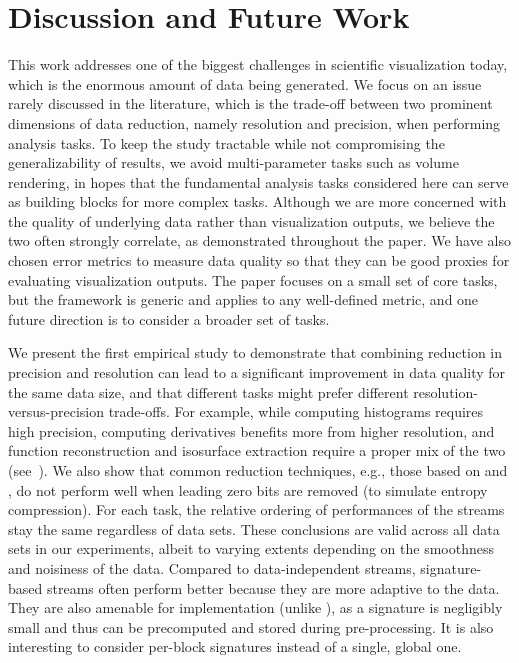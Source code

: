 \section{Discussion and Future Work}

{\color{blue}This work addresses one of the biggest challenges in scientific visualization today,
which is the enormous amount of data being generated. We focus on an issue rarely discussed in the
literature, which is the trade-off between two prominent dimensions of data reduction, namely
resolution and precision, when performing analysis tasks. To keep the study tractable while not
compromising the generalizability of results, we avoid multi-parameter tasks such as volume
rendering, in hopes that the fundamental analysis tasks considered here can serve as building blocks
for more complex tasks. Although we are more concerned with the quality of underlying data rather
than visualization outputs, we believe the two often strongly correlate, as demonstrated throughout
the paper. We have also chosen error metrics to measure data quality so that they can be good
proxies for evaluating visualization outputs. The paper focuses on a small set of core tasks, but
the framework is generic and applies to any well-defined metric, and one future direction is to
consider a broader set of tasks.}

We present the first empirical study to demonstrate that combining reduction in precision and
resolution can lead to a significant improvement in data quality for the same data size, and that
different tasks might prefer different resolution-versus-precision trade-offs. For example, while
computing histograms requires high precision, computing derivatives benefits more from higher
resolution, and function reconstruction and isosurface extraction require a proper mix of the two
(see~). We also show that common reduction techniques, e.g., those based on
\slvl and \smag, do not perform well when leading zero bits are removed (to simulate entropy
compression). {\color{red}For each task, the relative ordering of performances of the streams stay
the same regardless of data sets. These conclusions are valid across all data sets in our
experiments, albeit to varying extents depending on the smoothness and noisiness of the data.
Compared to data-independent streams, signature-based streams often perform better because they are
more adaptive to the data. They are also amenable for implementation (unlike \sopt), as a signature
is negligibly small and thus can be precomputed and stored during pre-processing. It is also
interesting to consider per-block signatures instead of a single, global one.}

